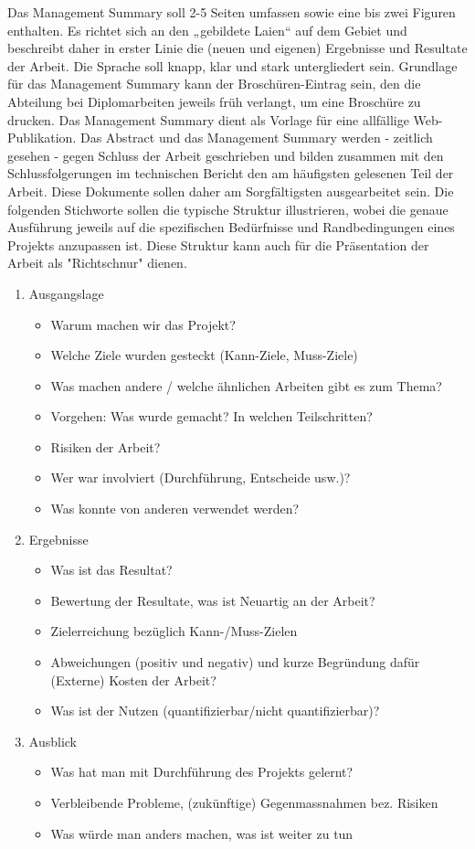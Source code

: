 Das Management Summary soll 2-5 Seiten umfassen sowie eine bis zwei Figuren enthalten. Es richtet sich an den „gebildete Laien“ auf dem Gebiet und beschreibt daher in erster Linie die (neuen und eigenen) Ergebnisse und Resultate der Arbeit. Die Sprache soll knapp, klar und stark untergliedert sein. 
Grundlage für das Management Summary kann der Broschüren-Eintrag sein, den die Abteilung bei Diplomarbeiten jeweils früh verlangt, um eine Broschüre zu drucken. Das Management Summary dient als Vorlage für eine allfällige Web-Publikation.
Das Abstract  und das Management Summary werden - zeitlich gesehen - gegen Schluss der Arbeit geschrieben und bilden zusammen mit den Schlussfolgerungen im technischen Bericht den am häufigsten gelesenen Teil der Arbeit. Diese Dokumente sollen daher am Sorgfältigsten ausgearbeitet sein.
Die folgenden Stichworte sollen die typische Struktur illustrieren, wobei die genaue Ausführung jeweils auf die spezifischen Bedürfnisse und Randbedingungen eines Projekts anzupassen ist. Diese Struktur kann auch für die Präsentation der Arbeit als "Richtschnur" dienen. 
\begin{enumerate}
\item Ausgangslage
	\begin{itemize}
 		\item Warum machen wir das Projekt?
		\item Welche Ziele wurden gesteckt (Kann-Ziele, Muss-Ziele)
		\item Was machen andere / welche ähnlichen Arbeiten gibt es zum Thema?
		\item Vorgehen: Was wurde gemacht? In welchen Teilschritten?
		\item Risiken der Arbeit?
		\item Wer war involviert (Durchführung, Entscheide usw.)?
		\item Was konnte von anderen verwendet werden?
	\end{itemize}
\item Ergebnisse
	\begin{itemize}
 		\item Was ist das Resultat? 
 		\item Bewertung der Resultate, was ist Neuartig an der Arbeit?
 		\item Zielerreichung bezüglich Kann-/Muss-Zielen
 		\item Abweichungen (positiv und negativ) und kurze Begründung dafür (Externe) Kosten der Arbeit?
 		\item Was ist der Nutzen (quantifizierbar/nicht quantifizierbar)?
	\end{itemize}
\item Ausblick
	\begin{itemize}
 		\item Was hat man mit Durchführung des Projekts gelernt?
 		\item Verbleibende Probleme, (zukünftige) Gegenmassnahmen bez. Risiken
 		\item Was würde man anders machen, was ist weiter zu tun
 	\end{itemize}
\end{enumerate}